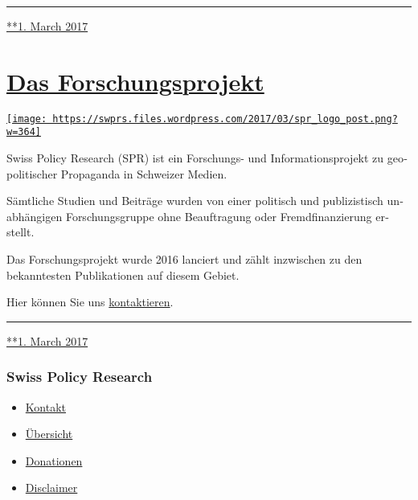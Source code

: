 \begin{center}\rule{0.5\linewidth}{\linethickness}\end{center}

\href{https://swprs.org/2017/03/01/medienspiegel/}{**1. March 2017}

\hypertarget{das-forschungsprojekt}{%
\section{\texorpdfstring{\href{https://swprs.org/2017/03/01/das-forschungsprojekt/}{Das
Forschungsprojekt}}{Das Forschungsprojekt}}\label{das-forschungsprojekt}}

\href{https://swprs.org/2017/03/01/das-forschungsprojekt/}{\texttt{[image: https://swprs.files.wordpress.com/2017/03/spr\_logo\_post.png?w=364]}}

Swiss Policy Research (SPR) ist ein Forschungs- und
Infor­ma­tions­projekt zu geo­po­li­tischer Pro­pa­ganda in Schweizer
Medien.

Sämtliche Studien und Bei­träge wurden von einer po­li­tisch und
pu­bli­zis­tisch un­ab­hän­gigen For­schungs­gruppe ohne Beauf­tra­gung
oder Fremd­finan­zierung er­­stellt.

Das Forschungsprojekt wurde 2016 lanciert und zählt inzwischen zu den
bekanntesten Publi­ka­tionen auf diesem Gebiet.

Hier können Sie uns \href{https://swprs.org/kontakt/}{kon­­tak­tieren}.

\begin{center}\rule{0.5\linewidth}{\linethickness}\end{center}

\href{https://swprs.org/2017/03/01/das-forschungsprojekt/}{**1. March
2017}

\hypertarget{swiss-policy-research}{%
\subsubsection{Swiss Policy Research}\label{swiss-policy-research}}

\begin{itemize}
\tightlist
\item
  \href{https://swprs.org/kontakt/}{Kontakt}
\item
  \href{https://swprs.org/uebersicht/}{Übersicht}
\item
  \href{https://swprs.org/donationen/}{Donationen}
\item
  \href{https://swprs.org/disclaimer/}{Disclaimer}
\end{itemize}

